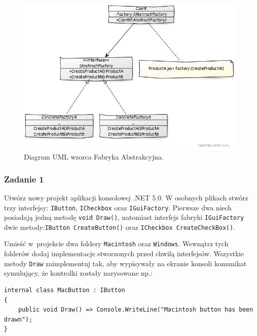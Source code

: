 \begin{figure}[hbt!]
	\centering
	\includegraphics[width=0.9\linewidth]{images/AbstractFactoryUml}
	\caption{Diagram UML wzorca Fabryka Abstrakcyjna.}
	\label{lab2/fig/AbstractFactoryUml}
\end{figure}
%


\subsubsection{Zadanie 1}

Utwórz nowy projekt aplikacji konsolowej .NET 5.0. W osobnych plikach stwórz trzy interfejsy: \texttt{IButton}, \texttt{ICheckbox} oraz \texttt{IGuiFactory}. Pierwsze dwa niech posiadają jedną metodę \texttt{void Draw()}, natomiast interfejs fabryki \texttt{IGuiFactory} dwie metody:\texttt{IButton CreateButton()} oraz \texttt{ICheckbox CreateCheckBox()}.

Umieść w~projekcie dwa foldery \texttt{Macintosh} oraz \texttt{Windows}. Wewnątrz tych folderów dodaj implementacje stworzonych przed chwilą interfejsów. Wszystkie metody \texttt{Draw} zaimplementuj tak, aby wypisywały na ekranie konsoli komunikat symulujący, że kontrolki zostały narysowane np.:
\begin{lstlisting}
internal class MacButton : IButton
{
	public void Draw() => Console.WriteLine("Macintosh button has been drawn");
}
\end{lstlisting}

